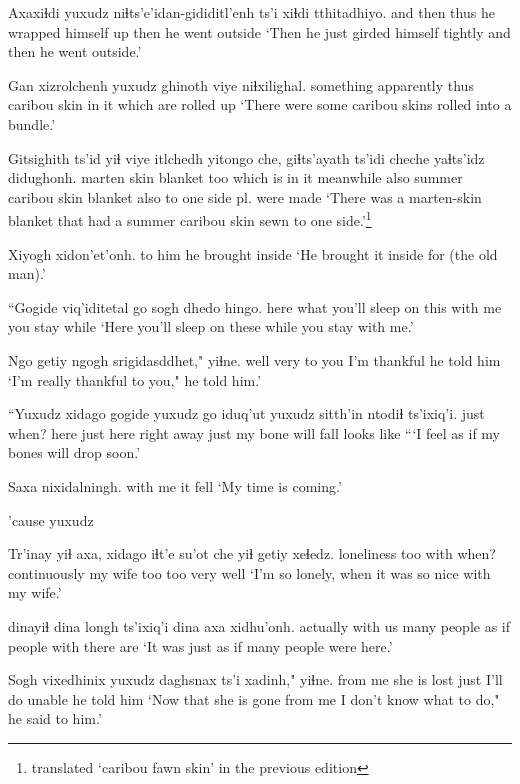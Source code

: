 \documentclass[12pt]{article}
\begin{document}
\gll Axaxiɬdi yuxudz {niɬts'e'idan-gididitl'enh} ts'i xiɬdi tthitadhiyo.
{and then} thus {he wrapped himself up} {} then {he went outside}
\glt `Then he just girded himself tightly and then he went outside.'
\glend

\gll Gan xizrolchenh yuxudz ghinoth viye niɬxilighal.
something apparently thus {caribou skin} {in it} {which are rolled up}
\glt `There were some caribou skins rolled into a bundle.'
\glend

\gll Gitsighith ts'id yiɬ {viye itlchedh} yitongo che, giɬts'ayath ts'idi cheche yaɬts'idz didughonh. 
{marten skin} blanket too {which is in it} meanwhile also {summer caribou skin} blanket also {to one side} {pl. were made}
\glt `There was a marten-skin blanket that had a summer caribou skin sewn to one side.'\footnote{translated `caribou fawn skin' in the previous edition}
\glend

\gll Xiyogh xidon'et'onh.
{to him} {he brought inside}
\glt `He brought it inside for (the old man).'
\glend

\gll ``Gogide viq'iditetal go sogh dhedo hingo.
here {what you'll sleep on} this {with me} {you stay} while
\glt `Here you'll sleep on these while you stay with me.'
\glend

\gll Ngo getiy ngogh srigidasddhet," yiɬne.
well very {to you} {I'm thankful} {he told him}
\glt `I'm really thankful to you," he told him.'
\glend

\gll ``Yuxudz xidago gogide yuxudz go iduq'ut yuxudz sitth'in ntodiɬ ts'ixiq'i.
just when?  here just here {right away} just {my bone} {will fall} {{} looks like} 
\glt ```I feel as if my bones will drop soon.'
\glend

\gll Saxa nixidalningh.
{with me} {it fell}
\glt `My time is coming.'
\glend

'cause yuxudz

\gll Tr'inay yiɬ axa, xidago iɬt'e su'ot che yiɬ getiy xeɬedz.
loneliness too with when? continuously {my wife} too too very well
\glt `I'm so lonely, when it was so nice with my wife.'
\glend

 dinayiɬ dina longh ts'ixiq'i dina axa xidhu'onh.
actually {with us} many people {{} as if} people with {there are}
\glt `It was just as if many people were here.'
\glend

\gll Sogh vixedhinix yuxudz daghsnax ts'i xadinh," yiɬne.
{from me} {she is lost} just {I'll do} {} unable {he told him}
\glt `Now that she is gone from me I don't know what to do," he said to him.'
\glend
\end{document}

